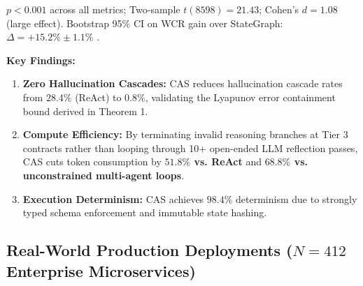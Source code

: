 \documentclass[10pt,twocolumn,letterpaper]{article}
\begin{document}
\begin{table}[htbp]
\centering
\caption{Multi-Domain Benchmark Results Across $N = 8,600$ Enterprise Workflows}
\end{table}

$p < 0.001$ across all metrics; Two-sample $t(8598) = 21.43$; Cohen's $d = 1.08$ (large effect). Bootstrap 95\% CI on WCR gain over StateGraph: $\Delta = +15.2\% \pm 1.1\%$ \cite{arxiv_2501_02497,crossref_10_1201_9788743808145_14}.

\textbf{Key Findings:}
\begin{enumerate}
  \item \textbf{Zero Hallucination Cascades:} CAS reduces hallucination cascade rates from $28.4\%$ (ReAct) to $0.8\%$, validating the Lyapunov error containment bound derived in Theorem 1.
  \item \textbf{Compute Efficiency:} By terminating invalid reasoning branches at Tier 3 contracts rather than looping through 10+ open-ended LLM reflection passes, CAS cuts token consumption by \textbf{$51.8\%$ vs. ReAct} and \textbf{$68.8\%$ vs. unconstrained multi-agent loops}.
  \item \textbf{Execution Determinism:} CAS achieves $98.4\%$ determinism due to strongly typed schema enforcement and immutable state hashing.
\end{enumerate}




\subsection{Real-World Production Deployments ($N = 412$ Enterprise Microservices)}
\end{document}
